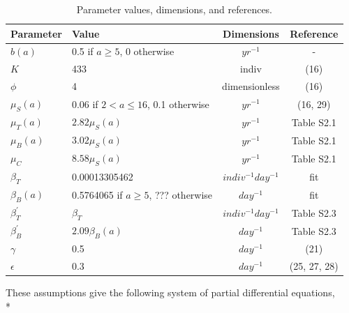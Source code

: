 \documentclass{article}
\begin{document}
\begin{table} %
\label {Table S3.2.}
\caption{Parameter values, dimensions, and references.}
\newcommand{\head}[1]{\textnormal{\textbf{#1}}}
\small
\begin{tabular}{llcc} %
\hline
\head{Parameter} & \head{Value} & \head{Dimensions} & \head{Reference}\\*
\hline
$b(a)$ & 0.5 if $a \geq 5$, 0 otherwise & $yr^{-1}$ & - \\*
$K $& 433 & indiv & (16) \\*
$\phi $& 4 & dimensionless & (16)\\* 
$\mu_S(a) $& 0.06 if $2 < a \leq 16$, 0.1 otherwise & $yr^{-1}$ & (16, 29) \\* 
$\mu_T(a) $& $2.82 \mu_S(a)$ & $yr^{-1}$ & Table S2.1 \\* 
$\mu_B(a) $& $3.02 \mu_S(a)$ & $yr^{-1}$ & Table S2.1 \\ 
$\mu_C$ & $8.58 \mu_S(a)$ & $yr^{-1}$ & Table S2.1 \\ 
$\beta_T $ & 0.00013305462 & $indiv^{-1}day^{-1}$ & fit \\
$\beta_B(a)$ & 0.5764065 if $a\geq 5$, ??? otherwise & $day^{-1}$ & fit \\
$\beta_{T}^{'}$  & $\beta_T$ & $indiv^{-1}day^{-1}$ & Table S2.3 \\
$\beta_{B}^{'}$  & $2.09 \beta_{B}(a)$ & $day^{-1}$ & Table S2.3 \\
$\gamma$& 0.5 & $day^{-1}$ & (21)\\
$\epsilon$& 0.3 & $day^{-1}$ & (25, 27, 28) \\
\hline 
\end{tabular}
\end{table} 

\pagebreak

\noindent
These assumptions give the following system of partial differential equations, \\*
\end{document}
